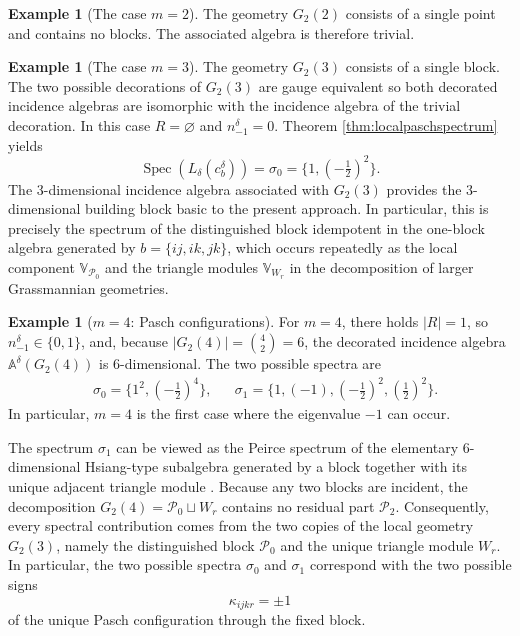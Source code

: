 \documentclass[times,11pt,reqno]{amsproc}
\theoremstyle{definition}
\newtheorem{example}[theorem]{Example}
\numberwithin{equation}{section}
\def\alg{\mathbb{A}}
\def\valg{\mathbb{V}}
\DeclareMathOperator{\Spec}{Spec}
\begin{document}
\begin{example}[The case $m = 2$]
The geometry $G_2(2)$ consists of a single point and contains no blocks. The associated algebra is therefore trivial.
\end{example}

\begin{example}[The case $m= 3$]
The geometry $G_2(3)$ consists of a single block. The two possible decorations of $G_2(3)$ are gauge equivalent so both decorated incidence algebras are isomorphic with the incidence algebra of the trivial decoration. In this case $R=\varnothing$ and
$n^{\delta}_{-1}=0$. Theorem \ref{thm:localpaschspectrum} yields
$$
\Spec(L_\delta(c_b^\delta))=\sigma_0
=
\{1,(-\tfrac12)^2\}.
$$
The $3$-dimensional incidence algebra associated with $G_2(3)$ provides the $3$-dimensional building block basic to the present approach. In particular, this is precisely the spectrum of the distinguished block idempotent in the one-block algebra generated by $b=\{ij,ik,jk\}$,
which occurs repeatedly as the local component $\valg_{\mathcal{P}_0}$ and the triangle modules $\valg_{W_r}$ in the decomposition of larger Grassmannian geometries.
\end{example}


\begin{example}[$m=4$: Pasch configurations]\label{ex:m4}
For $m=4$, there holds $|R|=1$, so $n^{\delta}_{-1}\in\{0,1\}$, and, because $|G_2(4)|=\binom42=6$, the decorated incidence algebra $\alg^\delta(G_2(4))$ is $6$-dimensional.
The two possible spectra are
\begin{align*}
&\sigma_0 =\{1^2,(-\tfrac12)^4\},&&\sigma_1=\{1,(-1),(-\tfrac12)^2,(\tfrac12)^2\}.
\end{align*}
In particular, $m=4$ is the first case where the eigenvalue $-1$ can occur.

The spectrum $\sigma_1$ can be viewed as the Peirce spectrum of the elementary $6$-dimensional Hsiang-type subalgebra generated by a block together with its unique adjacent triangle module \cite{Fox-Tka2026b}.
Because any two blocks are incident, the decomposition
$G_2(4) =
\mathcal{P}_0
\sqcup
W_r$ contains no residual part $\mathcal{P}_2$. Consequently, every spectral contribution comes from the two copies of the local geometry $G_2(3)$, namely the distinguished block $\mathcal{P}_0$ and the unique triangle module $W_r$.
In particular, the two possible spectra $\sigma_{0}$ and $\sigma_{1}$ correspond with the two possible signs
$$
\kappa_{ijkr}=\pm1
$$
of the unique Pasch configuration through the fixed block.
\end{example}
\end{document}
